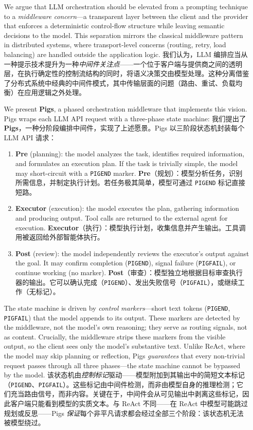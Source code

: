 We argue that LLM orchestration should be elevated from a prompting technique to a \emph{middleware concern}---a transparent layer between the client and the provider that enforces a deterministic control-flow structure while leaving semantic decisions to the model. This separation mirrors the classical middleware pattern in distributed systems, where transport-level concerns (routing, retry, load balancing) are handled outside the application logic.
我们认为，LLM 编排应当从一种提示技术提升为一种\emph{中间件关注点}——一个位于客户端与提供商之间的透明层，在执行确定性的控制流结构的同时，将语义决策交由模型处理。这种分离借鉴了分布式系统中经典的中间件模式，其中传输层面的问题（路由、重试、负载均衡）在应用逻辑之外处理。

We present \textbf{Pigs}, a phased orchestration middleware that implements this vision. Pigs wraps each LLM API request with a three-phase state machine:
我们提出了 \textbf{Pigs}，一种分阶段编排中间件，实现了上述愿景。Pigs 以三阶段状态机封装每个 LLM API 请求：

\begin{enumerate}[nosep]
    \item \textbf{Pre} (planning): the model analyzes the task, identifies required information, and formulates an execution plan. If the task is trivially simple, the model may short-circuit with a \texttt{PIGEND} marker.
    \textbf{Pre}（规划）：模型分析任务，识别所需信息，并制定执行计划。若任务极其简单，模型可通过 \texttt{PIGEND} 标记直接短路。
    \item \textbf{Executor} (execution): the model executes the plan, gathering information and producing output. Tool calls are returned to the external agent for execution.
    \textbf{Executor}（执行）：模型执行计划，收集信息并产生输出。工具调用被返回给外部智能体执行。
    \item \textbf{Post} (review): the model independently reviews the executor's output against the goal. It may confirm completion (\texttt{PIGEND}), signal failure (\texttt{PIGFAIL}), or continue working (no marker).
    \textbf{Post}（审查）：模型独立地根据目标审查执行器的输出。它可以确认完成（\texttt{PIGEND}）、发出失败信号（\texttt{PIGFAIL}），或继续工作（无标记）。
\end{enumerate}

The state machine is driven by \emph{control markers}---short text tokens (\texttt{PIGEND}, \texttt{PIGFAIL}) that the model appends to its output. These markers are detected by the middleware, not the model's own reasoning; they serve as routing signals, not as content. Crucially, the middleware strips these markers from the visible output, so the client sees only the model's substantive text. Unlike ReAct, where the model may skip planning or reflection, Pigs \emph{guarantees} that every non-trivial request passes through all three phases---the state machine cannot be bypassed by the model.
该状态机由\emph{控制标记}驱动——模型附加到其输出中的简短文本标记（\texttt{PIGEND}、\texttt{PIGFAIL}）。这些标记由中间件检测，而非由模型自身的推理检测；它们充当路由信号，而非内容。关键在于，中间件会从可见输出中剥离这些标记，因此客户端只能看到模型的实质文本。与 ReAct 不同——在 ReAct 中模型可能跳过规划或反思——Pigs \emph{保证}每个非平凡请求都会经过全部三个阶段：该状态机无法被模型绕过。

